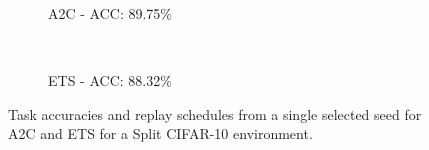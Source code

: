 \begin{figure}[t]
	\setlength{\figwidth}{0.26\textwidth}
	\setlength{\figheight}{.14\textheight}
	\begin{subfigure}[t]{0.44\textwidth}
		\centering
		
		\vspace{-4mm}
		\caption{A2C - ACC: 89.75\%}
		\label{fig:policy_cifar10_a2c}
	\end{subfigure}
	~~~~~%
	\begin{subfigure}[t]{0.44\textwidth}
		\centering
		
		\vspace{-4mm}
		\caption{ETS - ACC: 88.32\%}
		\label{fig:policy_cifar10_ets}
	\end{subfigure}
	\vspace{-2mm}
	\caption{Task accuracies and replay schedules from a single selected seed for A2C and ETS for a Split CIFAR-10 environment. %
	}
	\vspace{-3mm}
	\label{fig:policy_cifar10}
\end{figure}

\begin{comment}

\vspace{-3mm}
\begin{wrapfigure}{r}{0.5\textwidth}
	\setlength{\figwidth}{0.26\textwidth}
	\setlength{\figheight}{.14\textheight}
	\vspace{-2mm}
	\begin{subfigure}[b]{0.48\textwidth}
		\centering
		
		\vspace{-4mm}
		\caption{A2C - ACC: 89.75\%}
		\label{fig:policy_cifar10_a2c}
	\end{subfigure}
	\\[1mm]
	\begin{subfigure}[b]{0.48\textwidth}
		\centering
		
		\vspace{-4mm}
		\caption{ETS - ACC: 88.32\%}
		\label{fig:policy_cifar10_ets}
	\end{subfigure}
	\caption{Task accuracies and replay schedules for A2C and ETS for a Split CIFAR-10 environment.%
	}
	\vspace{-3mm}
	\label{fig:policy_cifar10}
\end{wrapfigure}
	content...
\end{comment}

